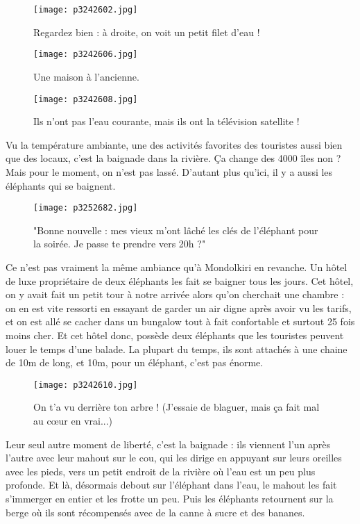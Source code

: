 \documentclass{book}
\begin{document}
\begin{figure}[h]
\centering
\texttt{[image: p3242602.jpg]}
\caption*{Regardez bien : à droite, on voit un petit filet d'eau !}
\end{figure}


\begin{figure}[h]
\centering
\texttt{[image: p3242606.jpg]}
\caption*{Une maison à l'ancienne.}
\end{figure}


\begin{figure}[h]
\centering
\texttt{[image: p3242608.jpg]}
\caption*{Ils n'ont pas l'eau courante, mais ils ont la télévision satellite !}
\end{figure}

Vu la température ambiante, une des activités favorites des touristes aussi bien que des locaux, c'est la baignade dans la rivière. Ça change des 4000 îles non ? Mais pour le moment, on n'est pas lassé. D'autant plus qu'ici, il y a aussi les éléphants qui se baignent.


\begin{figure}[h]
\centering
\texttt{[image: p3252682.jpg]}
\caption*{"Bonne nouvelle : mes vieux m'ont lâché les clés de l'éléphant pour la soirée. Je passe te prendre vers 20h ?"}
\end{figure}

Ce n'est pas vraiment la même ambiance qu'à Mondolkiri en revanche. Un hôtel de luxe propriétaire de deux éléphants les fait se baigner tous les jours. Cet hôtel, on y avait fait un petit tour à notre arrivée alors qu'on cherchait une chambre : on en est vite ressorti en essayant de garder un air digne après avoir vu les tarifs, et on est allé se cacher dans un bungalow tout à fait confortable et surtout 25 fois moins cher. Et cet hôtel donc, possède deux éléphants que les touristes peuvent louer le temps d'une balade. La plupart du temps, ils sont attachés à une chaine de 10m de long, et 10m, pour un éléphant, c'est pas énorme.


\begin{figure}[h]
\centering
\texttt{[image: p3242610.jpg]}
\caption*{On t'a vu derrière ton arbre ! (J'essaie de blaguer, mais ça fait mal au cœur en vrai...)}
\end{figure}

Leur seul autre moment de liberté, c'est la baignade : ils viennent l'un après l'autre avec leur mahout sur le cou, qui les dirige en appuyant sur leurs oreilles avec les pieds, vers un petit endroit de la rivière où l'eau est un peu plus profonde. Et là, désormais debout sur l'éléphant dans l'eau, le mahout les fait s'immerger en entier et les frotte un peu. Puis les éléphants retournent sur la berge où ils sont récompensés avec de la canne à sucre et des bananes.
\end{document}
